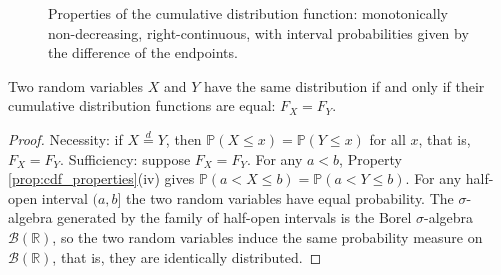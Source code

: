 \begin{figure}[htbp]
\centering
{}
\caption{Properties of the cumulative distribution function: monotonically non-decreasing, right-continuous, with interval probabilities given by the difference of the endpoints.}
\label{fig:cdf_properties}
\end{figure}

\begin{theorem}\label{thm:cdf_uniqueness}
Two random variables $X$ and $Y$ have the same distribution if and only if their cumulative distribution functions are equal: $F_X = F_Y$.
\end{theorem}

\begin{proof}
Necessity: if $X\stackrel{d}{=}Y$, then $\mathbb P(X\le x)=\mathbb P(Y\le x)$ for all $x$, that is, $F_X=F_Y$. Sufficiency: suppose $F_X = F_Y$. For any $a < b$, Property \ref{prop:cdf_properties}(iv) gives $\mathbb{P}(a < X \le b) = \mathbb{P}(a < Y \le b)$. For any half-open interval $(a, b]$ the two random variables have equal probability. The $\sigma$-algebra generated by the family of half-open intervals is the Borel $\sigma$-algebra $\mathcal{B}(\mathbb{R})$, so the two random variables induce the same probability measure on $\mathcal{B}(\mathbb{R})$, that is, they are identically distributed.
\end{proof}

